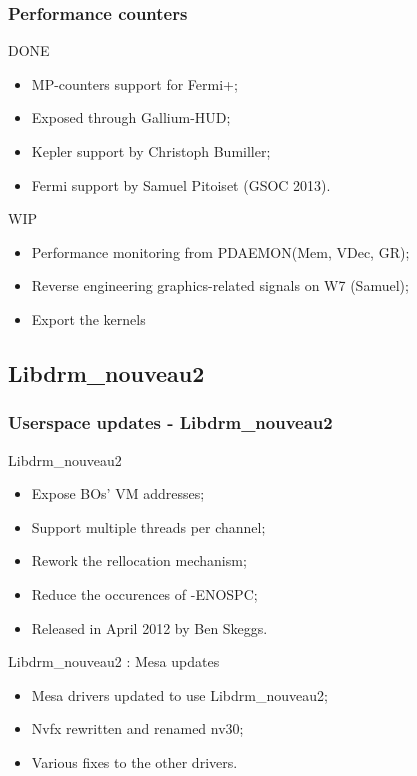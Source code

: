 \documentclass[11pt,english,compress]{beamer}
\begin{document}
\begin{frame}
	\frametitle{Performance counters}

	\begin{block}{DONE}
		\begin{itemize}
			\item MP-counters support for Fermi+;
			\item Exposed through Gallium-HUD;
			\item Kepler support by Christoph Bumiller;
			\item Fermi support by Samuel Pitoiset (GSOC 2013).
		\end{itemize}
	\end{block}

	\begin{block}{WIP}
		\begin{itemize}
			\item Performance monitoring from PDAEMON(Mem, VDec,
GR);
			\item Reverse engineering graphics-related signals on
W7 (Samuel);
			\item Export the kernels
		\end{itemize}
	\end{block}

\end{frame}

\subsection{Libdrm\_nouveau2}
\begin{frame}
	\frametitle{Userspace updates - Libdrm\_nouveau2}

	\begin{block}{Libdrm\_nouveau2}
		\begin{itemize}
			\item Expose BOs' VM addresses;
			\item Support multiple threads per channel;
			\item Rework the rellocation mechanism;
			\item Reduce the occurences of -ENOSPC;
			\item Released in April 2012 by Ben Skeggs.
		\end{itemize}
	\end{block}

	\begin{block}{Libdrm\_nouveau2 : Mesa updates}
		\begin{itemize}
			\item Mesa drivers updated to use Libdrm\_nouveau2;
			\item Nvfx rewritten and renamed nv30;
			\item Various fixes to the other drivers.
		\end{itemize}
	\end{block}
\end{frame}
\end{document}
